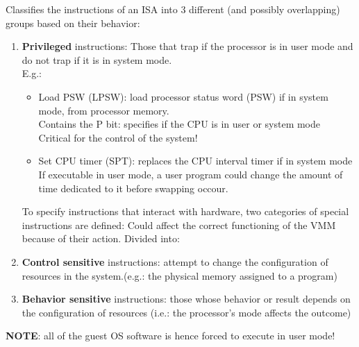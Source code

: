 \documentclass[10pt, oneside]{article}
\begin{document}
\newline
Classifies the instructions of an ISA into 3 different (and possibly overlapping) groups based on their behavior:\begin{enumerate}
    \item {\bf Privileged} instructions: Those that trap if the processor is in user mode and do not trap if it is in system mode.\\E.g.:\begin{itemize}
        \item Load PSW (LPSW): load processor status word (PSW) if in system mode, from processor memory.\\
        Contains the P bit: specifies if the CPU is in user or system mode\\Critical for the control of the system!
        \item Set CPU timer (SPT): replaces the CPU interval timer if in system mode\\If executable in user mode, a user program could change the amount of time dedicated to it before swapping occour.
    \end{itemize}
To specify instructions that interact with hardware, two categories of special instructions are defined:
Could affect the correct functioning of the VMM because of their action. Divided into:
    \item {\bf Control sensitive }instructions: attempt to change the configuration of resources in the system.(e.g.: the physical memory assigned to a program)
    \item {\bf Behavior sensitive} instructions: those whose behavior or result depends on the configuration of resources (i.e.: the processor's mode affects the outcome)
\end{enumerate}
{\bf NOTE}: all of the guest OS software is hence forced to execute in user mode!
\end{document}
